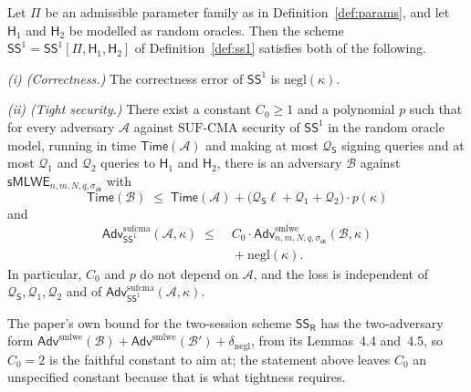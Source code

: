 \documentclass{aicr-conjecture}
\newcommand{\cA}{\mathcal{A}}
\newcommand{\cB}{\mathcal{B}}
\newcommand{\cQ}{\mathcal{Q}}
\newcommand{\negl}{\mathrm{negl}}
\newcommand{\Adv}{\mathsf{Adv}}
\newcommand{\Time}{\mathsf{Time}}
\newcommand{\smlwe}{\mathsf{sMLWE}}
\newcommand{\SSone}{\mathsf{SS}^1}
\newcommand{\ssk}{\sigma_{\mathsf{sk}}}
\newcommand{\Hone}{\mathsf{H}_1}
\newcommand{\Htwo}{\mathsf{H}_2}
\begin{document}
\begin{conjecture}[tight security of $\SSone$]\label{conj:main}
Let $\Pi$ be an admissible parameter family as in
Definition~\ref{def:params}, and let $\Hone$ and $\Htwo$ be modelled as
random oracles. Then the scheme $\SSone = \SSone[\Pi,\Hone,\Htwo]$ of
Definition~\ref{def:ss1} satisfies both of the following.

\smallskip\noindent\emph{(i) (Correctness.)} The correctness error of
$\SSone$ is $\negl(\kappa)$.

\smallskip\noindent\emph{(ii) (Tight security.)} There exist a constant
$C_0 \ge 1$ and a polynomial $p$ such that for every adversary $\cA$
against $\mathrm{SUF\text{-}CMA}$ security of $\SSone$ in the random
oracle model, running in time $\Time(\cA)$ and making at most
$\cQ_{\mathsf{S}}$ signing queries and at most $\cQ_1$ and $\cQ_2$
queries to $\Hone$ and $\Htwo$, there is an adversary $\cB$ against
$\smlwe_{n,m,N,q,\ssk}$ with
\[
  \Time(\cB) \;\le\; \Time(\cA)
    + \bigl(\cQ_{\mathsf{S}}\ell + \cQ_1 + \cQ_2\bigr)\cdot p(\kappa)
\]
and
\begin{align*}
  \Adv^{\mathrm{sufcma}}_{\SSone}(\cA,\kappa) \;\le\;
    & C_0 \cdot
      \Adv^{\mathrm{smlwe}}_{n,m,N,q,\ssk}(\cB,\kappa) \\
    & {}+ \negl(\kappa).
\end{align*}
In particular, $C_0$ and $p$ do not depend on $\cA$, and the loss is
independent of $\cQ_{\mathsf{S}},\cQ_1,\cQ_2$ and of
$\Adv^{\mathrm{sufcma}}_{\SSone}(\cA,\kappa)$.
\end{conjecture}

\begin{remark}\label{rem:cnought}
The paper's own bound for the two-session scheme
$\mathsf{SS}_{\mathsf{R}}$ has the two-adversary form
$\Adv^{\mathrm{smlwe}}(\cB) + \Adv^{\mathrm{smlwe}}(\cB') +
\delta_{\negl}$, from its Lemmas~4.4 and~4.5, so $C_0 = 2$ is the
faithful constant to aim at; the statement above leaves $C_0$ an
unspecified constant because that is what tightness requires.
\end{remark}
\end{document}
